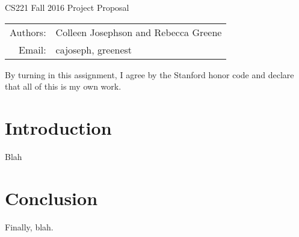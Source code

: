 \documentclass[12pt]{article}
\begin{document}
\begin{center}
{\Large CS221 Fall 2016 Project Proposal}

\begin{tabular}{rl}
  Authors: & Colleen Josephson and Rebecca Greene\\
  Email: & cajoseph, greenest
\end{tabular}
\end{center}

By turning in this assignment, I agree by the Stanford honor code and
declare that all of this is my own work.

\section*{Introduction}

Blah

\section*{Conclusion}

Finally, blah.
\end{document}

